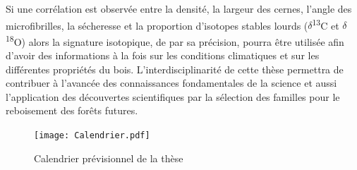 \documentclass[a4paper,12pt]{report}
\newcommand{\Ctreize}{$\delta$\textsuperscript{13}C\xspace}
\newcommand{\Odixhuit}{$\delta$\textsuperscript{18}O\xspace}
\begin{document}
Si une corrélation est observée entre la densité, la largeur des cernes, l'angle des microfibrilles, la sécheresse et la proportion d'isotopes stables lourds (\Ctreize et \Odixhuit) alors la signature isotopique, de par sa précision, pourra être utilisée afin d'avoir des informations à la fois sur les conditions climatiques et sur les différentes propriétés du bois. L'interdisciplinarité de cette thèse permettra de contribuer à l'avancée des connaissances fondamentales de la science et aussi l'application des découvertes scientifiques par la sélection des familles pour le reboisement des forêts futures. \\

\clearpage
	
\begin{figure}
	\texttt{[image: Calendrier.pdf]}
	\caption{Calendrier prévisionnel de la thèse}
	\label{fig:calendrier}
	\end{figure}




\end{document}
